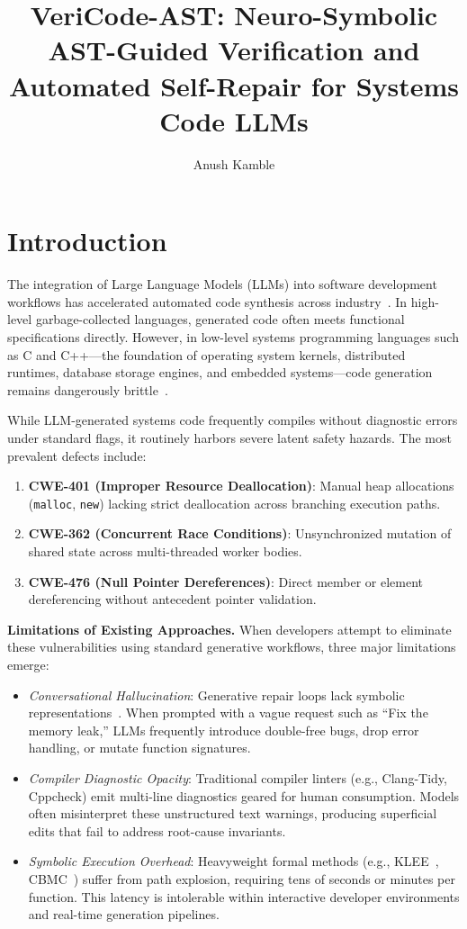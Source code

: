 \documentclass[sigconf,screen,nonacm,pbalance]{acmart}
\title[VeriCode-AST: Neuro-Symbolic Verification \& Self-Repair]{VeriCode-AST: Neuro-Symbolic AST-Guided Verification and Automated Self-Repair for Systems Code LLMs}
\author{Anush Kamble}
\affiliation{%
  \department{Department of Computational and Data Science}
  \institution{National Institute of Technology Warangal}
  \city{Warangal}
  \country{India}
}
\begin{document}
\maketitle

\section{Introduction}
\label{sec:intro}

The integration of Large Language Models (LLMs) into software development workflows has accelerated automated code synthesis across industry~\cite{chen2021codex, dakhel2023github}. In high-level garbage-collected languages, generated code often meets functional specifications directly. However, in low-level systems programming languages such as C and C++---the foundation of operating system kernels, distributed runtimes, database storage engines, and embedded systems---code generation remains dangerously brittle~\cite{pearce2022asleep, siddiq2023empirical}. 

While LLM-generated systems code frequently compiles without diagnostic errors under standard flags, it routinely harbors severe latent safety hazards. The most prevalent defects include:
\begin{enumerate}
    \item \textbf{CWE-401 (Improper Resource Deallocation)}: Manual heap allocations (\texttt{malloc}, \texttt{new}) lacking strict deallocation across branching execution paths.
    \item \textbf{CWE-362 (Concurrent Race Conditions)}: Unsynchronized mutation of shared state across multi-threaded worker bodies.
    \item \textbf{CWE-476 (Null Pointer Dereferences)}: Direct member or element dereferencing without antecedent pointer validation.
\end{enumerate}

\noindent\textbf{Limitations of Existing Approaches.} When developers attempt to eliminate these vulnerabilities using standard generative workflows, three major limitations emerge:
\begin{itemize}
    \item \emph{Conversational Hallucination}: Generative repair loops lack symbolic representations~\cite{bouzenia2024repairing}. When prompted with a vague request such as ``Fix the memory leak,'' LLMs frequently introduce double-free bugs, drop error handling, or mutate function signatures.
    \item \emph{Compiler Diagnostic Opacity}: Traditional compiler linters (e.g., Clang-Tidy, Cppcheck) emit multi-line diagnostics geared for human consumption. Models often misinterpret these unstructured text warnings, producing superficial edits that fail to address root-cause invariants.
    \item \emph{Symbolic Execution Overhead}: Heavyweight formal methods (e.g., KLEE~\cite{cadar2008klee}, CBMC~\cite{clarke2004tool}) suffer from path explosion, requiring tens of seconds or minutes per function. This latency is intolerable within interactive developer environments and real-time generation pipelines.
\end{itemize}
\end{document}
